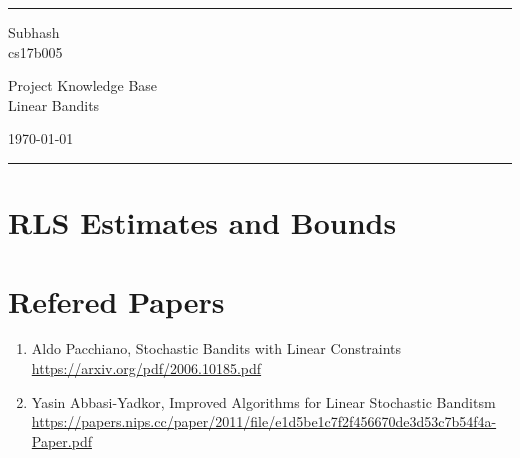 \documentclass[a4paper]{article}
\begin{document}

\fancyhead[C]{}
\hrule \medskip %
\begin{minipage}{0.295\textwidth} 
\raggedright
\footnotesize
Subhash \hfill\\   
cs17b005 \hfill\\

\end{minipage}
\begin{minipage}{0.4\textwidth} 
\centering 
\large 
Project Knowledge Base\\ 
\normalsize 
Linear Bandits\\ 
\end{minipage}
\begin{minipage}{0.295\textwidth} 
\raggedleft
\today\hfill\\
\end{minipage}
\medskip\hrule 
\bigskip


\section{RLS Estimates and Bounds}





\section{Refered Papers}
\begin{enumerate}
    \item Aldo Pacchiano, Stochastic Bandits with Linear Constraints \\ \url{https://arxiv.org/pdf/2006.10185.pdf}
    \item Yasin Abbasi-Yadkor, Improved Algorithms for Linear Stochastic Banditsm \\ \url{https://papers.nips.cc/paper/2011/file/e1d5be1c7f2f456670de3d53c7b54f4a-Paper.pdf}
\end{enumerate}







\end{document}
